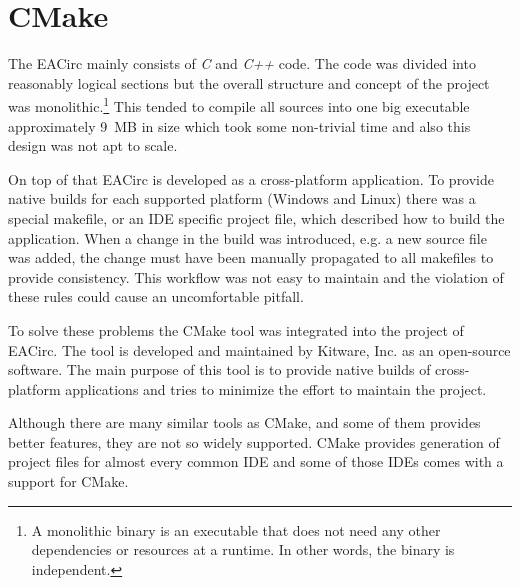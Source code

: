 \documentclass[12pt,oneside]{fithesis2}
\begin{document}
\FrontMatter
	\ThesisTitlePage
	\tableofcontents

\MainMatter
\chapter{CMake}
The EACirc mainly consists of \emph{C} and \emph{C++} code. The code was divided into reasonably logical sections but the overall structure and concept of the project was monolithic.\footnote{A monolithic binary is an executable that does not need any other dependencies or resources at a runtime. In other words, the binary is independent.} This tended to compile all sources into one big executable approximately 9~MB in size which took some non-trivial time and also this design was not apt to scale.

On top of that EACirc is developed as a cross-platform application. To provide native builds for each supported platform (Windows \cite{win} and Linux) there was a special makefile, or an IDE specific project file, which described how to build the application. When a change in the build was introduced, e.g. a new source file was added, the change must have been manually propagated to all makefiles to provide consistency. This workflow was not easy to maintain and the violation of these rules could cause an uncomfortable pitfall.

To solve these problems the CMake \cite{cmake} tool was integrated into the project of EACirc. The tool is developed and maintained by Kitware, Inc. \cite{kitware} as an open-source software. The main purpose of this tool is to provide native builds of cross-platform applications and tries to minimize the effort to maintain the project.

Although there are many similar tools as CMake, and some of them provides better features, they are not so widely supported. CMake provides generation of project files for almost every common IDE and some of those IDEs comes with a support for CMake.
\end{document}
